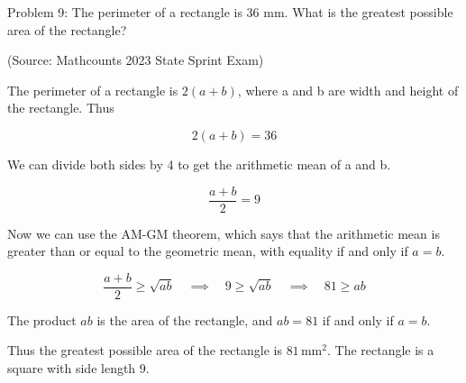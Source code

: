 Problem 9: The perimeter of a rectangle is 36 mm. What is the greatest possible area of the rectangle?

(Source: Mathcounts 2023 State Sprint Exam)

The perimeter of a rectangle is $2(a + b)$, where a and b are width and height of the rectangle. Thus

$$ 2(a + b) = 36 $$

We can divide both sides by 4 to get the arithmetic mean of a and b.

$$ \frac{a + b}{2} = 9 $$

Now we can use the AM-GM theorem, which says that the arithmetic mean is greater than or equal to the geometric mean, with equality if and only if $a = b$.

$$ \frac{a + b}{2} \geq \sqrt{ab} \quad \implies \quad 9 \geq \sqrt{ab} \quad \implies \quad 81 \geq ab $$

The product $ab$ is the area of the rectangle, and $ab = 81$ if and only if $a = b$. 

Thus the greatest possible area of the rectangle is $\boxed{81 \, \text{mm}^2}$. The rectangle is a square with side length 9.
